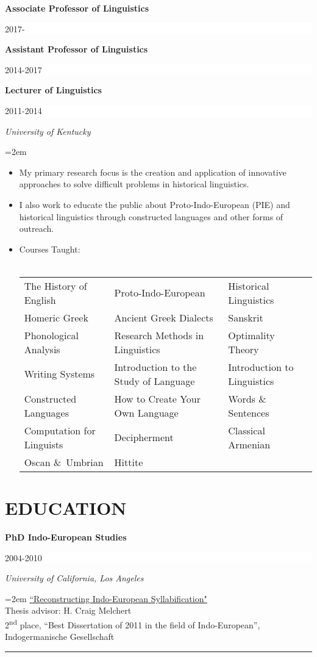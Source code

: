 \documentclass[paper=letter,fontsize=11pt]{scrartcl} %
\newcommand{\sepspace}{\vspace*{1em}}		%
\newcommand{\NewPart}[2]{\section*{\uppercase{#1} #2}}
\newcommand{\EducationEntry}[4]{
		\noindent \textbf{#1} \hfill      %
		\colorbox{White}{%
			\parbox{6em}{%
			\hfill\color{Black}#2}} \par  %
		\noindent \textit{#3} \par        %
		\noindent\hangindent=2em\hangafter=0 \small #4 %
		\normalsize \par}
\begin{document}
\noindent \textbf{Associate Professor of Linguistics} \hfill      %
		\colorbox{White}{%
			\parbox{6em}{%
			\hfill\color{Black}2017-$\qquad$}} \par
\noindent \textbf{\color{Black}Assistant Professor of Linguistics} \hfill      %
		\colorbox{White}{%
			\parbox{6em}{%
			\hfill\color{Black}2014-2017}} \par
\EducationEntry{{\color{Black}Lecturer of Linguistics}}{2011-2014}{University of Kentucky}
{\begin{itemize}
\item{My primary research focus is the creation and application of innovative approaches to solve difficult problems in historical linguistics.}
\item I also work to educate the public about Proto-Indo-European (PIE) and historical linguistics through constructed languages and other forms of outreach.
\item{Courses Taught:\\
\\
\begin{tabular}{l l l}
The History of English & Proto-Indo-European  & Historical Linguistics \\
Homeric Greek & Ancient Greek Dialects & Sanskrit	\\
Phonological Analysis & Research Methods in Linguistics & Optimality Theory	\\
Writing Systems & Introduction to the Study of Language & Introduction to Linguistics \\
Constructed Languages & How to Create Your Own Language & Words \& Sentences\\
Computation for Linguists & Decipherment & Classical Armenian \\
Oscan \&~Umbrian & Hittite& \\
\end{tabular}}
\end{itemize}}

\sepspace

\NewPart{Education}{}

\EducationEntry{PhD Indo-European Studies}{2004-2010}{University of California, Los Angeles}{{\href{https://uknowledge.uky.edu/cgi/viewcontent.cgi?referer=https://www.google.com/&httpsredir=1&article=1054&context=lin_facpub}{``Reconstructing Indo-European Syllabification"}\\
Thesis advisor: H. Craig Melchert\\
2\textsuperscript{nd} place, ``Best Dissertation of 2011 in the field of Indo-European”, Indogermanische Gesellschaft}
}
\noindent\rule{8cm}{0.2pt}
\end{document}
